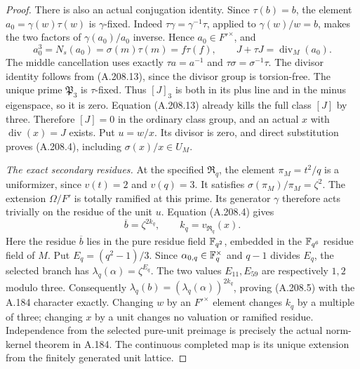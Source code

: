 \begin{proof}
There is also an actual conjugation identity.  Since
\(\tau(b)=b\), the element
\(a_0=\gamma(w)\tau(w)\) is \(\gamma\)-fixed.  Indeed
\(\tau\gamma=\gamma^{-1}\tau\), applied to
\(\gamma(w)/w=b\), makes the two factors of
\(\gamma(a_0)/a_0\) inverse.  Hence \(a_0\in F'^\times\),
and
\[
 a_0^3=N_s(a_0)=\sigma(m)\tau(m)=f\tau(f),
 \qquad J+\tau J=\operatorname{div}_M(a_0).
\tag{A.208.14}
\]
The middle cancellation uses exactly \(\tau a=a^{-1}\)
and \(\tau\sigma=\sigma^{-1}\tau\).  The divisor identity
follows from (A.208.13), since the divisor group is torsion-free.
The unique prime \(\mathfrak P_3\) is \(\tau\)-fixed.
Thus \([J]_3\) is both in its plus line and in the minus
eigenspace, so it is zero.  Equation (A.208.13) already kills
the full class \([J]\) by three.  Therefore \([J]=0\)
in the ordinary class group, and an actual \(x\) with
\(\operatorname{div}(x)=J\) exists.  Put \(u=w/x\).
Its divisor is zero, and direct substitution proves
(A.208.4), including \(\sigma(x)/x\in U_M\).

\emph{The exact secondary residues.}
At the specified \(\mathfrak R_q\), the element
\(\pi_M=t^2/q\) is a uniformizer, since
\(v(t)=2\) and \(v(q)=3\).  It satisfies
\(\sigma(\pi_M)/\pi_M=\zeta^2\).
The extension \(\Omega/F'\) is totally ramified at this
prime.  Its generator \(\gamma\) therefore acts trivially
on the residue of the unit \(u\).  Equation (A.208.4) gives
\[
        \overline b=\zeta^{2k_q},
              \qquad k_q=v_{\mathfrak R_q}(x).
\tag{A.208.15}
\]
Here the residue \(\overline b\) lies in the pure residue
field \(\mathbb F_{q^2}\), embedded in the \(\mathbb F_{q^6}\) residue
field of \(M\).  Put \(E_q=(q^2-1)/3\).
Since \(\alpha_{0,q}\in\mathbb F_q^\times\) and
\(q-1\) divides \(E_q\), the selected branch has
\(\lambda_q(\alpha)=\zeta^{E_q}\).  The two values
\(E_{11},E_{59}\) are respectively \(1,2\) modulo three.
Consequently
\(\lambda_q(b)=(\lambda_q(\alpha))^{2k_q}\), proving
(A.208.5) with the A.184 character exactly.
Changing \(w\) by an \(F'^\times\) element changes \(k_q\)
by a multiple of three; changing \(x\) by a unit changes no
valuation or ramified residue.  Independence from the selected
pure-unit preimage is precisely the actual norm-kernel theorem
in A.184.  The continuous completed map is its unique extension
from the finitely generated unit lattice.


\end{proof}
